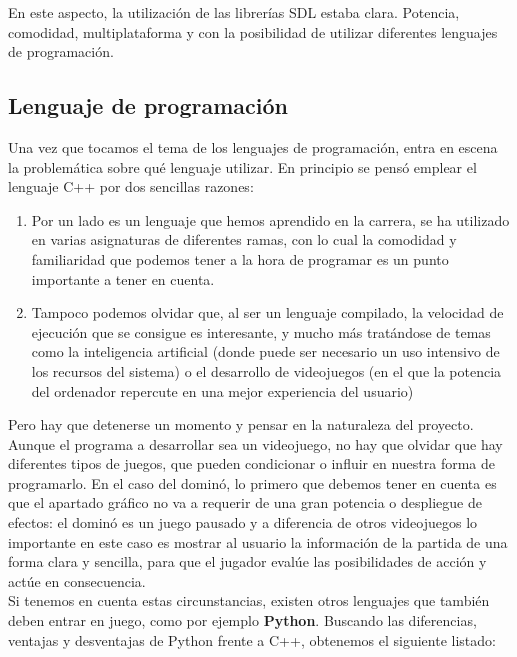En este aspecto, la utilización de las librerías SDL estaba clara. Potencia, comodidad, multiplataforma y con la posibilidad
de utilizar diferentes lenguajes de programación.\\

\subsection{Lenguaje de programación}

Una vez que tocamos el tema de los lenguajes de programación, entra en escena la problemática sobre qué lenguaje
utilizar. En principio se pensó emplear el lenguaje C++ por dos sencillas razones:

\begin{enumerate}
    \item Por un lado es un lenguaje que hemos aprendido en la carrera, se ha utilizado en varias asignaturas de
            diferentes ramas, con lo cual la comodidad y familiaridad que podemos tener a la hora de programar
            es un punto importante a tener en cuenta.
    \item Tampoco podemos olvidar que, al ser un lenguaje compilado, la velocidad de ejecución que se consigue
            es interesante, y mucho más tratándose de temas como la inteligencia artificial (donde puede ser
            necesario un uso intensivo de los recursos del sistema) o el desarrollo de videojuegos (en el que
            la potencia del ordenador repercute en una mejor experiencia del usuario)
\end{enumerate}

Pero hay que detenerse un momento y pensar en la naturaleza del proyecto. Aunque el programa a desarrollar sea un
videojuego, no hay que olvidar que hay diferentes tipos de juegos, que pueden condicionar o influir en nuestra forma
de programarlo. En el caso del dominó, lo primero que debemos tener en cuenta es que el apartado gráfico no va a
requerir de una gran potencia o despliegue de efectos: el dominó es un juego pausado y a diferencia de otros
videojuegos lo importante en este caso es mostrar al usuario la información de la partida de una forma clara y sencilla,
para que el jugador evalúe las posibilidades de acción y actúe en consecuencia.\\

Si tenemos en cuenta estas circunstancias, existen otros lenguajes que también deben entrar en juego,
como por ejemplo \textbf{Python}. Buscando las diferencias, ventajas y desventajas de Python frente a C++,
obtenemos el siguiente listado:

